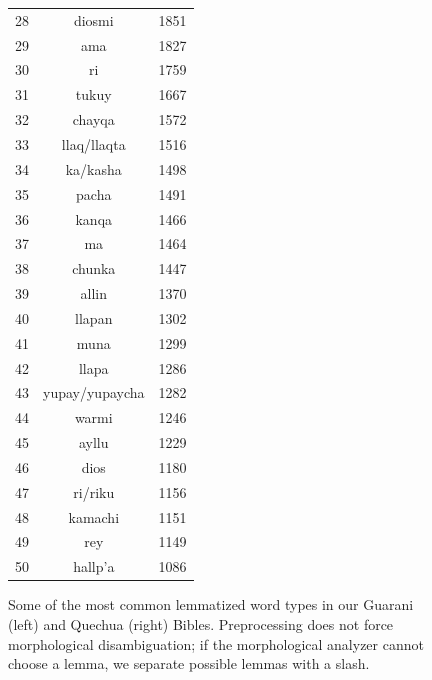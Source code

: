 \begin{figure}
\begin{tiny}
\begin{centering}
\begin{tabular}{|r|c|c|}
28 & diosmi & 1851 \\
29 & ama & 1827 \\
30 & ri & 1759 \\
31 & tukuy & 1667 \\
32 & chayqa & 1572 \\
33 & llaq/llaqta & 1516 \\
34 & ka/kasha & 1498 \\
35 & pacha & 1491 \\
36 & kanqa & 1466 \\
37 & ma & 1464 \\
38 & chunka & 1447 \\
39 & allin & 1370 \\
40 & llapan & 1302 \\
41 & muna & 1299 \\
42 & llapa & 1286 \\
43 & yupay/yupaycha & 1282 \\
44 & warmi & 1246 \\
45 & ayllu & 1229 \\
46 & dios & 1180 \\
47 & ri/riku & 1156 \\
48 & kamachi & 1151 \\
49 & rey & 1149 \\
50 & hallp'a & 1086 \\
    \hline
  \end{tabular}
  \end{centering}
  \end{tiny}
  \caption{Some of the most common lemmatized word types in our Guarani (left)
  and Quechua (right) Bibles. Preprocessing does not force morphological
  disambiguation; if the morphological analyzer cannot choose a lemma, we
  separate possible lemmas with a slash.}
  \label{fig:mostcommon-gn-qu}
\end{figure}

